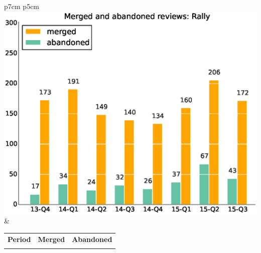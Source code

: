 \documentclass[a4wide,11pt]{article}
\begin{document}
\begin{tabular}{p{7cm} p{5cm}}
    \vspace{0pt} 
    \includegraphics[scale=.35]{figs/submitted_reviewsRally.eps}
    & 
    \vspace{0pt}
    \begin{tabular}{l|r|r|}%
    \bfseries Period & \bfseries Merged & \bfseries Abandoned %
    \csvreader[head to column names]{data/submitted_reviewsRally.csv}{}%
    {\\ & \merged & \abandoned}
    \end{tabular}
\end{tabular}



\end{document}

